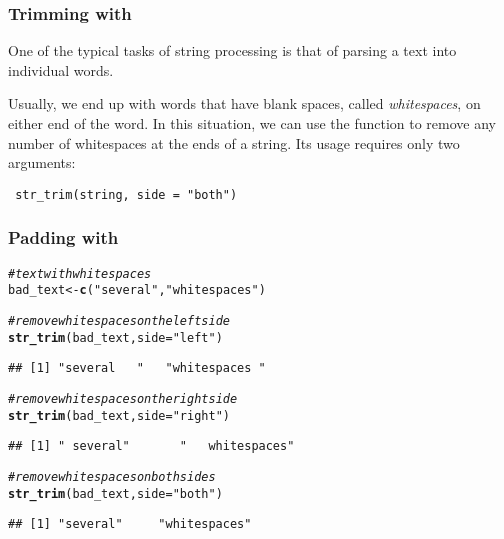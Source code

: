 \documentclass[12pt]{beamer}\usepackage[]{graphicx}\usepackage[]{color}
\makeatletter
\newcommand{\hlstr}[1]{\textcolor[rgb]{0.192,0.494,0.8}{#1}}%
\newcommand{\hlcom}[1]{\textcolor[rgb]{0.678,0.584,0.686}{\textit{#1}}}%
\newcommand{\hlstd}[1]{\textcolor[rgb]{0.345,0.345,0.345}{#1}}%
\newcommand{\hlkwb}[1]{\textcolor[rgb]{0.69,0.353,0.396}{#1}}%
\newcommand{\hlkwc}[1]{\textcolor[rgb]{0.333,0.667,0.333}{#1}}%
\newcommand{\hlkwd}[1]{\textcolor[rgb]{0.737,0.353,0.396}{\textbf{#1}}}%
\newenvironment{kframe}{%
 \def\at@end@of@kframe{}%
 \ifinner\ifhmode%
  \def\at@end@of@kframe{\end{minipage}}%
  \begin{minipage}{\columnwidth}%
 \fi\fi%
 \def\FrameCommand##1{\hskip\@totalleftmargin \hskip-\fboxsep
 \colorbox{shadecolor}{##1}\hskip-\fboxsep
     \hskip-\linewidth \hskip-\@totalleftmargin \hskip\columnwidth}%
 \MakeFramed {\advance\hsize-\width
   \@totalleftmargin\z@ \linewidth\hsize
   \@setminipage}}%
 {\par\unskip\endMakeFramed%
 \at@end@of@kframe}
\newenvironment{knitrout}{}{} %
\makeatother
\begin{document}

\begin{frame}[fragile]
\frametitle{Trimming with }

One of the typical tasks of string processing is that of parsing a text into individual words.

Usually, we end up with words that have blank spaces, called \textit{whitespaces}, on either end of the word. In this situation, we can use the  function to remove any number of whitespaces at the ends of a string. Its usage requires only two arguments:
\begin{verbatim}
 str_trim(string, side = "both")
\end{verbatim}

\end{frame}


\begin{frame}[fragile]
\frametitle{Padding with }

\begin{knitrout}\footnotesize
{}\color{fgcolor}\begin{kframe}
\begin{alltt}
\hlcom{# text with whitespaces}
\hlstd{bad_text} \hlkwb{<-} \hlkwd{c}\hlstd{(}\hlstr{" several   "}\hlstd{,} \hlstr{"   whitespaces "}\hlstd{)}

\hlcom{# remove whitespaces on the left side}
\hlkwd{str_trim}\hlstd{(bad_text,} \hlkwc{side} \hlstd{=} \hlstr{"left"}\hlstd{)}
\end{alltt}
\begin{verbatim}
## [1] "several   "   "whitespaces "
\end{verbatim}
\begin{alltt}
\hlcom{# remove whitespaces on the right side}
\hlkwd{str_trim}\hlstd{(bad_text,} \hlkwc{side} \hlstd{=} \hlstr{"right"}\hlstd{)}
\end{alltt}
\begin{verbatim}
## [1] " several"       "   whitespaces"
\end{verbatim}
\begin{alltt}
\hlcom{# remove whitespaces on both sides}
\hlkwd{str_trim}\hlstd{(bad_text,} \hlkwc{side} \hlstd{=} \hlstr{"both"}\hlstd{)}
\end{alltt}
\begin{verbatim}
## [1] "several"     "whitespaces"
\end{verbatim}
\end{kframe}
\end{knitrout}

\end{frame}
\end{document}
